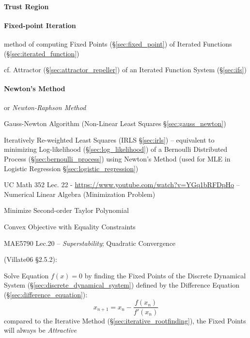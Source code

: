{\paragraph{Trust Region}\label{sec:trust_region}\hfill

\paragraph{Fixed-point Iteration}\label{sec:fixedpoint_iteration}\hfill

method of computing Fixed Points (\S\ref{sec:fixed_point}) of Iterated Functions
(\S\ref{sec:iterated_function})

cf. Attractor (\S\ref{sec:attractor_repeller}) of an Iterated Function System
(\S\ref{sec:ifs})



\paragraph{Newton's Method}\label{sec:newtons_method}\hfill

or \emph{Newton-Raphson Method}

\fist Gauss-Newton Algorithm (Non-Linear Least Squares \S\ref{sec:gauss_newton})

\fist Iteratively Re-weighted Least Squares (IRLS \S\ref{sec:irls}) --
equivalent to minimizing Log-likelihood (\S\ref{sec:log_likelihood}) of a
Bernoulli Distributed Process (\S\ref{sec:bernoulli_process}) using Newton's
Method (used for MLE in Logistic Regression \S\ref{sec:logistic_regression})

UC Math 352 Lec. 22 - \url{https://www.youtube.com/watch?v=YGq1bRFDpHo} --
Numerical Linear Algebra (Minimization Problem)

Minimize Second-order Taylor Polynomial

Convex Objective with Equality Constraints

MAE5790 Lec.20 -- \emph{Superstability}; Quadratic Convergence

(Villate06 \S 2.5.2):

Solve Equation $f(x) = 0$ by finding the Fixed Points of the Discrete Dynamical
System (\S\ref{sec:discrete_dynamical_system}) defined by the Difference
Equation (\S\ref{sec:difference_equation}):
\[
  x_{n+1} = x_n - \frac{f(x_n)}{f'(x_n)}
\]
compared to the Iterative Method (\S\ref{sec:iterative_rootfinding}), the Fixed
Points will always be \emph{Attractive}

}
